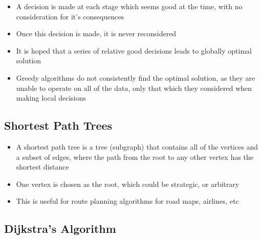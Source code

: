 \begin{itemize}
  \item A decision is made at each stage which seems good at the time, with no consideration for it's consequences
  \item Once this decision is made, it is never reconsidered
  \item It is hoped that a series of relative good decisions leads to globally optimal solution
  \item Greedy algorithms do not consistently find the optimal solution, as they are unable to operate on all of the data, only that which they considered when making local decisions
\end{itemize}

\subsection*{Shortest Path Trees}

\begin{itemize}
  \item A shortest path tree is a tree (subgraph) that contains all of the vertices and a subset of edges, where the path from the root to any other vertex has the shortest distance
  \item One vertex is chosen as the root, which could be strategic, or arbitrary
  \item This is useful for route planning algorithms for road maps, airlines, etc
\end{itemize}

\subsection*{Dijkstra's Algorithm}

